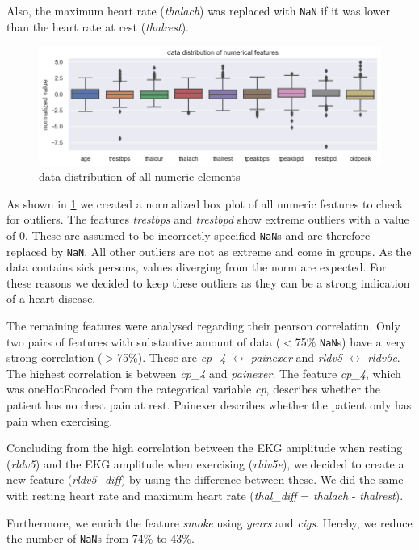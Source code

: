 Also, the maximum heart rate (\emph{thalach}) was replaced with \texttt{NaN} if it was lower than the heart rate at rest (\emph{thalrest}).

\begin{figure}[h]
	\centering
	\includegraphics[width=\textwidth]{images/dataDistribution.png}
	\caption{data distribution of all numeric elements}
	\label{fig:dataDistribution}
\end{figure}
As shown in \cref{fig:dataDistribution} we created a normalized box plot of all numeric features to check for outliers. The features \emph{trestbps} and \emph{trestbpd} show extreme outliers with a value of 0. These are assumed to be incorrectly specified \texttt{NaN}s and are therefore replaced by \texttt{NaN}. All other outliers are not as extreme and come in groups. As the data contains sick persons, values diverging from the norm are expected. For these reasons we decided to keep these outliers as they can be a strong indication of a heart disease.

The remaining features were analysed regarding their pearson correlation. Only two pairs of features with substantive amount of data ($<$75\% \texttt{NaN}s) have a very strong correlation ($>$75\%).  
These are \emph{cp\_4} $\leftrightarrow$ \emph{painexer} and \emph{rldv5} $\leftrightarrow$ \emph{rldv5e}. The highest correlation is between \emph{cp\_4} and \emph{painexer}. The feature \emph{cp\_4}, which was oneHotEncoded from the categorical variable \emph{cp}, describes whether the patient has no chest pain at rest. Painexer describes whether the patient only has pain when exercising. 

Concluding from the high correlation between the EKG amplitude when resting (\emph{rldv5}) and the EKG amplitude when exercising (\emph{rldv5e}), we decided to create a new feature (\emph{rldv5\_diff}) by using the difference between these. We did the same with resting heart rate and maximum heart rate (\emph{thal\_diff} = \emph{thalach} - \emph{thalrest}). 

Furthermore, we enrich the feature \emph{smoke} using \emph{years} and \emph{cigs}. Hereby, we reduce the number of \texttt{NaN}s from 74\% to 43\%. 

